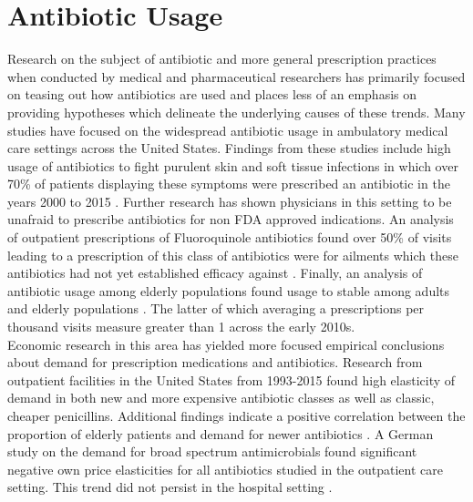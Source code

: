 \section{Antibiotic Usage}
Research on the subject of antibiotic and more general prescription practices when conducted by medical and pharmaceutical researchers has primarily focused on teasing out how antibiotics are used and places less of an emphasis on providing hypotheses which delineate the underlying causes of these trends. Many studies have focused on the widespread antibiotic usage in ambulatory medical care settings across the United States. Findings from these studies include high usage of antibiotics to fight purulent skin and soft tissue infections in which over 70\% of patients displaying these symptoms were prescribed an antibiotic in the years 2000 to 2015 \cite{fritz_national_2020}. Further research has shown physicians in this setting to be unafraid to prescribe antibiotics for non FDA approved indications. An analysis of outpatient prescriptions of Fluoroquinole antibiotics found over 50\% of visits leading to a prescription of this class of antibiotics were for ailments which these antibiotics had not yet established efficacy against \cite{almalki_off-label_2016}. Finally, an analysis of antibiotic usage among elderly populations found usage to stable among adults \cite{roumie_trends_2005} and elderly populations \cite{kabbani_outpatient_2018}. The latter of which averaging a prescriptions per thousand visits measure greater than 1 across the early 2010s.\\
\indent Economic research in this area has yielded more focused empirical conclusions about demand for prescription medications and antibiotics. Research from outpatient facilities in the United States from 1993-2015 found high elasticity of demand in both new and more expensive antibiotic classes as well as classic, cheaper penicillins. Additional findings indicate a positive correlation between the proportion of elderly patients and demand for newer antibiotics \cite{kianmehr_system_2020}. A German study on the demand for broad spectrum antimicrobials found significant negative own price elasticities for all antibiotics studied in the outpatient care setting. This trend did not persist in the hospital setting \cite{kaier_impact_2013}.\\

